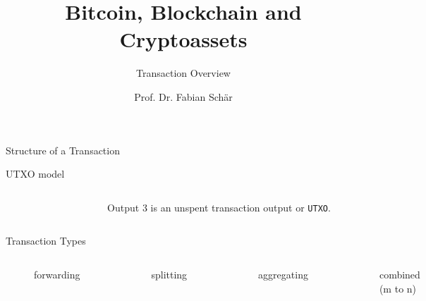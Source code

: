 \documentclass[handout]{beamer}
\title{Bitcoin, Blockchain and Cryptoassets}
\subtitle{Transaction Overview}
\author{Prof. Dr. Fabian Schär}
\institute{University of Basel}
\begin{document}
\thispagestyle{empty}
\begin{frame}[noframenumbering]
	\titlepage
\end{frame}


\begin{frame}{Structure of a Transaction}
	\centering
	\begin{figure}
	
	\end{figure} 
\end{frame}	


\begin{frame}{UTXO model}

\begin{columns}
  \begin{column}{0.7\textwidth}
    \begin{figure}[h!]
    \center
    
    \end{figure}
  \end{column}
  
  \begin{column}{0.3\textwidth}
  Output 3 is an unspent transaction output or \texttt{UTXO}.
  \end{column}
\end{columns}
\end{frame}


\begin{frame}{Transaction Types}
\begin{columns}

	\vspace{1cm}
	\begin{figure}
		
		\vspace{2.5em}
		\caption*{forwarding}
	\end{figure} 
	\vspace{0.4cm}
	\begin{figure}
		
		\caption*{splitting}
	\end{figure}
	\begin{figure}
		
		\caption*{aggregating}
	\end{figure}
	\vspace{0.5cm}
	\begin{figure}
		
		\caption*{combined (m to n)}
	\end{figure}
	
\end{columns}
\end{frame}
\end{document}

